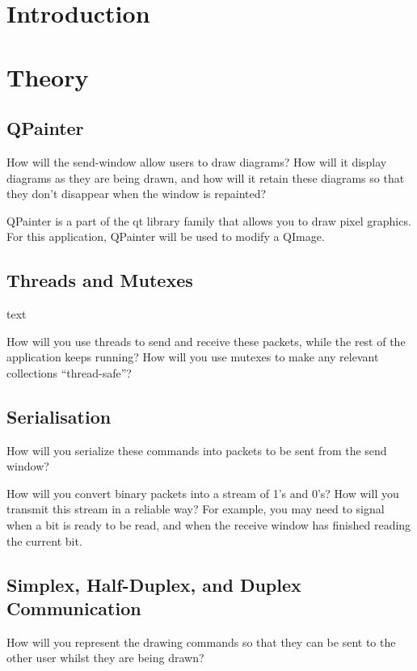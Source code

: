 \documentclass[10pt]{article}
\begin{document}
\begin{multicols*}{2}

\section{Introduction}

\section{Theory}
\subsection{QPainter}
How will the send-window allow users to draw diagrams? How will it display
diagrams as they are being drawn, and how will it retain these diagrams so
that they don’t disappear when the window is repainted?

QPainter is a part of the qt library family that allows you to draw pixel graphics. For this application, QPainter will be used to modify a QImage.

\subsection{Threads and Mutexes}
text

How will you use threads to send and receive these packets, while the rest of
the application keeps running? How will you use mutexes to make any relevant
collections “thread-safe”?

\subsection{Serialisation}
How will you serialize these commands into packets to be sent from the send
window?

How will you convert binary packets into a stream of 1’s and 0’s? How will you
transmit this stream in a reliable way? For example, you may need to signal
when a bit is ready to be read, and when the receive window has finished
reading the current bit.

\subsection{Simplex, Half-Duplex, and Duplex Communication}
How will you represent the drawing commands so that they can be sent to the
other user whilst they are being drawn?


\end{multicols*}
\end{document}

